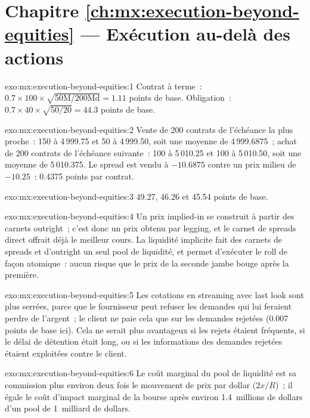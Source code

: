 \section*{Chapitre \ref{ch:mx:execution-beyond-equities} --- Exécution au-delà des actions}

\begin{solution}{exo:mx:execution-beyond-equities:1}
Contrat à terme~: $0.7\times100\times\sqrt{50\text{M}/200\text{Md}}=1.11$ points de base. Obligation~: $0.7\times40\times\sqrt{50/20}=44.3$ points de base.
\end{solution}

\begin{solution}{exo:mx:execution-beyond-equities:2}
Vente de 200 contrats de l'échéance la plus proche~: 150 à 4\,999.75 et 50 à 4\,999.50, soit une moyenne de 4\,999.6875~; achat de 200 contrats de l'échéance suivante~: 100 à 5\,010.25 et 100 à 5\,010.50, soit une moyenne de
5\,010.375. Le spread est vendu à $-10.6875$ contre un prix milieu de $-10.25$~: 0.4375 points par contrat.
\end{solution}

\begin{solution}{exo:mx:execution-beyond-equities:3}
49.27, 46.26 et 45.54 points de base.
\end{solution}

\begin{solution}{exo:mx:execution-beyond-equities:4}
Un prix implied-in se construit à partir des carnets outright~; c'est donc un prix obtenu par legging, et le carnet de spreads direct offrait déjà le meilleur cours. La
liquidité implicite fait des carnets de spreads et d'outright un seul pool de liquidité, et permet d'exécuter le roll de façon atomique~: aucun risque que le prix de la seconde jambe bouge après la première.
\end{solution}

\begin{solution}{exo:mx:execution-beyond-equities:5}
Les cotations en streaming avec last look sont plus serrées, parce que le fournisseur peut refuser les demandes qui lui feraient perdre de l'argent~; le client ne paie cela que sur les
demandes rejetées (0.007 points de base ici). Cela ne serait plus avantageux si les rejets étaient fréquents, si le délai de détention était long, ou si les informations
des demandes rejetées étaient exploitées contre le client.
\end{solution}

\begin{solution}{exo:mx:execution-beyond-equities:6}
Le coût marginal du pool de liquidité est sa commission plus environ deux fois le mouvement de prix par dollar ($2x/R$)~; il égale le coût d'impact marginal de la bourse après environ
1.4~millions de dollars d'un pool de 1~milliard de dollars.
\end{solution}

